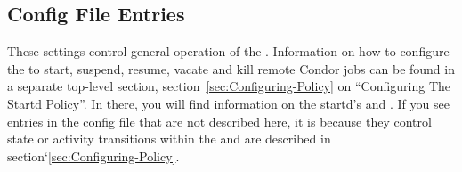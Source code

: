 \subsection{ Config File Entries}
\label{sec:Startd-Config-File-Entries}

These settings control general operation of the .
Information on how to configure the  to start, suspend,
resume, vacate and kill remote Condor jobs can be found in a separate
top-level section, section~\ref{sec:Configuring-Policy} on
``Configuring The Startd Policy''.  In there, you will find
information on the startd's  and .  If
you see entries in the config file that are not described here, it is
because they control state or activity transitions within the
 and are described in
section`\ref{sec:Configuring-Policy}. 

